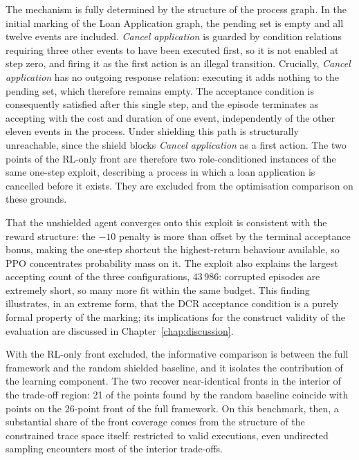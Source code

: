 The mechanism is fully determined by the structure of the process
graph. In the initial marking of the Loan Application graph, the
pending set is empty and all twelve events are included.
\textit{Cancel application} is guarded by condition relations requiring
three other events to have been executed first, so it is not enabled at
step zero, and firing it as the first action is an illegal transition.
Crucially, \textit{Cancel application} has no outgoing response
relation: executing it adds nothing to the pending set, which therefore
remains empty. The acceptance condition is consequently satisfied after
this single step, and the episode terminates as accepting with the cost
and duration of one event, independently of the other eleven events in
the process. Under shielding this path is structurally unreachable,
since the shield blocks \textit{Cancel application} as a first action.
The two points of the \ac{RL}-only front are therefore two
role-conditioned instances of the same one-step exploit, describing a
process in which a loan application is cancelled before it exists. They
are excluded from the optimisation comparison on these grounds.

That the unshielded agent converges onto this exploit is consistent
with the reward structure: the $-10$ penalty is more than offset by the
terminal acceptance bonus, making the one-step shortcut the
highest-return behaviour available, so \ac{PPO} concentrates
probability mass on it. The exploit also explains the largest accepting
count of the three configurations, 43\,986: corrupted episodes are
extremely short, so many more fit within the same budget. This finding
illustrates, in an extreme form, that the \ac{DCR} acceptance condition
is a purely formal property of the marking; its implications for the
construct validity of the evaluation are discussed in
Chapter~\ref{chap:discussion}.

With the \ac{RL}-only front excluded, the informative comparison is
between the full framework and the random shielded baseline, and it
isolates the contribution of the learning component. The two recover
near-identical fronts in the interior of the trade-off region: 21 of
the points found by the random baseline coincide with points on the
26-point front of the full framework. On this benchmark, then, a
substantial share of the front coverage comes from the structure of the
constrained trace space itself: restricted to valid executions, even
undirected sampling encounters most of the interior trade-offs.

